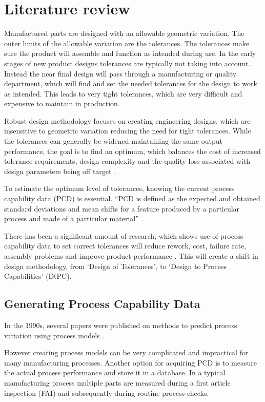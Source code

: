 \documentclass[aip,amsmath, reprint, author-year]{revtex4-1}
\begin{document}
\section{Literature review}
Manufactured parts are designed with an allowable geometric variation. The outer limits of the allowable variation are the tolerances. The tolerances make sure the product will assemble and function as intended during use. In the early stages of new product designs tolerances are typically not taking into account. Instead the near final design will pass through a manufacturing or quality department, which will find and set the needed tolerances for the design to work as intended. This leads to very tight tolerances, which are very difficult and expensive to maintain in production. 

Robust design methodology focuses on creating engineering designs, which are insensitive to geometric variation reducing the need for tight tolerances. While the tolerances can generally be widened maintaining the same output performance, the goal is to find an optimum, which balances the cost of increased tolerance requirements, design complexity and the quality loss associated with design parameters being off target \citep{arvidsson2008principles}.

To estimate the optimum level of tolerances, knowing the current process capability data (PCD) is essential. “PCD is defined as the expected and obtained standard deviations and mean shifts for a feature produced by a particular process and made of a particular material” 
 \citep{tata1999process}.

There has been a significant amount of research, which shows use of process capability data to set correct tolerances will reduce rework, cost, failure rate, assembly problems and improve product performance  \citep{tata1999process}.
This will create a shift in design methodology, from ‘Design of Tolerances’, to ‘Design to Process Capabilities’ (DtPC). 

\subsection{Generating Process Capability Data}
In the 1990s, several papers were published on methods to predict process variation using process models  \citep{thornton2000use}. 

However creating process models can be very complicated and impractical for many manufacturing processes. Another option for acquiring PCD is to measure the actual process performance and store it in a database. In a typical manufacturing process multiple parts are measured during a first article inspection (FAI) and subsequently during routine process checks. 
\end{document}
